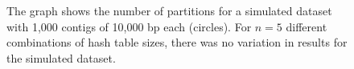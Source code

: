 \documentclass{pnastwo}
\begin{document}
\begin{figure}

\caption{The graph shows the number of partitions for a simulated dataset with
  1,000 contigs of 10,000 bp each (circles). For $n=5$ different
  combinations of hash table sizes, there was no variation in results
  for the simulated dataset.}

\label{fig:partfp}
\end{figure}

\makeatother

\end{document}
